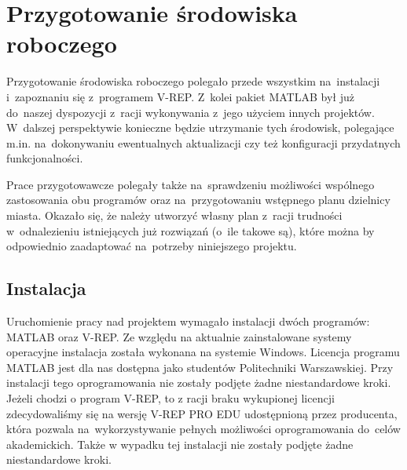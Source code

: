 \documentclass[11pt, a4paper, twoside]{report}
\begin{document}
\section{Przygotowanie środowiska roboczego}
\label{sec:przygotowanie}
Przygotowanie środowiska roboczego polegało przede wszystkim na~instalacji i~zapoznaniu się z~programem V-REP. Z~kolei pakiet MATLAB był już do~naszej dyspozycji z~racji wykonywania z~jego użyciem innych projektów. W~dalszej perspektywie konieczne będzie utrzymanie tych środowisk,  polegające m.in. na~dokonywaniu ewentualnych aktualizacji czy też konfiguracji przydatnych funkcjonalności.

Prace przygotowawcze polegały także na~sprawdzeniu możliwości wspólnego zastosowania obu programów oraz na~przygotowaniu wstępnego planu dzielnicy miasta. Okazało się, że należy utworzyć własny plan z~racji trudności w~odnalezieniu istniejących już rozwiązań (o~ile takowe są), które można by odpowiednio zaadaptować na~potrzeby niniejszego projektu.

\subsection{Instalacja}
\label{subsec:instalacja}
Uruchomienie pracy nad projektem wymagało instalacji dwóch programów: MATLAB oraz \mbox{V-REP}. Ze względu na aktualnie zainstalowane systemy operacyjne instalacja została wykonana na systemie Windows. Licencja programu MATLAB jest dla nas dostępna jako studentów Politechniki Warszawskiej. Przy instalacji tego oprogramowania nie zostały podjęte żadne niestandardowe kroki. Jeżeli chodzi o program V-REP, to z racji braku wykupionej licencji zdecydowaliśmy się na wersję V-REP PRO EDU udostępnioną przez producenta, która pozwala na~wykorzystywanie pełnych możliwości oprogramowania do~celów akademickich. Także w wypadku tej instalacji nie zostały podjęte żadne niestandardowe kroki.
\end{document}
